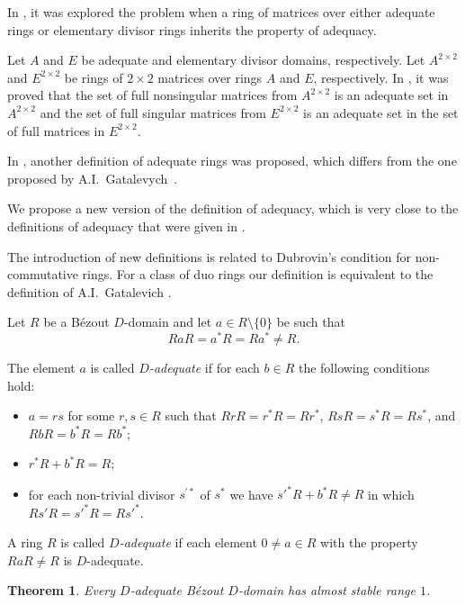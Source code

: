 \documentclass[12pt,a4paper, reqno]{amsart}
\newtheorem{theorem}{Theorem}
\begin{document}
In \cite{Shchedryk_Gatalevich}, it was explored the problem when  a ring of matrices over either adequate rings or elementary divisor rings inherits the property of adequacy.

Let  $A$ and $E$ be   adequate and elementary divisor domains, respectively. Let  $A^{2 \times 2}$ and $E^{2 \times 2}$  be    rings of ${2 \times 2}$ matrices over rings  $A$ and $E$, respectively. In \cite{Shchedryk_Gatalevich}, it was  proved that the set of full nonsingular matrices from $A^{2 \times 2}$ is an  adequate  set in $A^{2 \times 2}$ and the set of full singular matrices from $E^{2 \times 2}$ is an  adequate set  in the set of full matrices in $E^{2 \times 2}$.


In \cite{Bovdi_Shchedryk_adecvate}, another definition of adequate rings was proposed,
which differs from the one  proposed by A.I.~Gatalevych~\cite[Definition 1, p.\,116]{Gatalevich}.


We  propose a  new version of the definition of adequacy, which is very close to the definitions of adequacy that were given in \cite{Gatalevich, Shchedryk_Gatalevich,Bovdi_Shchedryk_adecvate}.

The introduction of new definitions is related to Dubrovin's condition for non-commutative rings. For a class of duo rings our definition is equivalent to the definition of A.I.~Gatalevich \cite[Definition 1, p.\,116]{Gatalevich}.

Let $R$ be a B\'ezout $D$-domain and  let $a\in R\setminus\{0\}$ be such that
\[
RaR=a^*R=Ra^*\ne R.
\]

The element $a$ is called  {\it $D$-adequate} if for each $b\in R$  the following conditions hold:
\begin{itemize}
\item[(i)] $a=rs$ for some $r,s\in R$ such that  $RrR=r^*R=Rr^*$, $RsR=s^*R=Rs^*$, and  \linebreak $RbR=b^*R=Rb^*$;
\item[(ii)]$r^*R+b^*R=R$;
\item[(iii)]for each non-trivial divisor $s^{\prime *}$ of $s^*$ we have $s'^*R+b^*R\ne R$ in which  $Rs'R=s'^*R=Rs'^*$.
\end{itemize}

A ring $R$ is called {\it $D$-adequate} if each  element $0\not=a\in R$ with the property  $RaR\ne R$  is $D$-adequate.




\begin{theorem}\label{T:11}
Every    $D$-adequate B\'ezout $D$-domain  has  almost stable range $1$.
\end{theorem}
\end{document}
